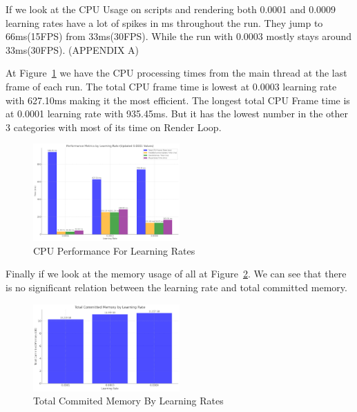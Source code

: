 \documentclass{LSkill}
\begin{document}
If we look at the CPU Usage on scripts and rendering both 0.0001 and 0.0009 learning rates have a lot of spikes in ms throughout the run. They jump to 66ms(15FPS) from 33ms(30FPS). While the run with 0.0003 mostly stays around 33ms(30FPS).
(APPENDIX A)
\vspace{0.5cm}

At Figure~\ref{fig:CPU Performance For Learning Rates} we have the CPU processing times from the main thread at the last frame of each run. The total CPU frame time is lowest at 0.0003 learning rate with 627.10ms making it the most efficient. The longest total CPU Frame time is at 0.0001 learning rate with 935.45ms. But it has the lowest number in the other 3 categories with most of its time on Render Loop.

\begin{figure}[htbp]
    \centering
    \includegraphics[width=0.5\textwidth]{figure 5.png} 
    \caption{CPU Performance For Learning Rates}
    \label{fig:CPU Performance For Learning Rates}
\end{figure}
\vspace{0.5cm}
Finally if we look at the memory usage of all at Figure~\ref{fig:Total Commited Memory By Learning Rates}. We can see that there is no significant relation between the learning rate and total committed memory.

\begin{figure}[htbp]
    \centering
    \includegraphics[width=0.5\textwidth]{figure 6.png} 
    \caption{Total Commited Memory By Learning Rates}
    \label{fig:Total Commited Memory By Learning Rates}
\end{figure}
\end{document}
